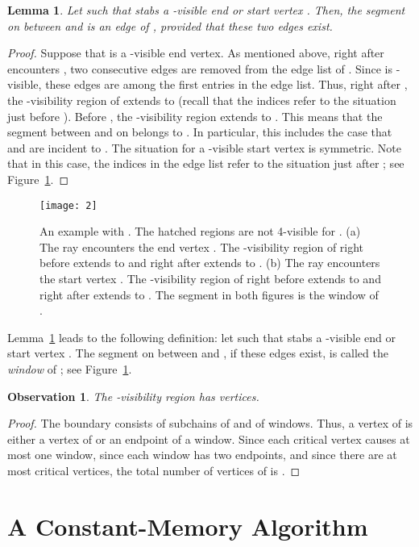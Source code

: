 \documentclass[11pt, a4paper]{article}
\newtheorem{lem}[theorem1]{Lemma}{\bfseries}{\itshape}
\newtheorem{obs}[theorem1]{Observation}{\bfseries}{\itshape}
\begin{document}
\begin{lem}\label{lem:window}
Let  such that 
 stabs a -visible end or start vertex . Then, the 
segment on  between  and 
 is an edge of ,
provided that these two edges exist.
\end{lem}
\begin{proof}
Suppose that  is a -visible end vertex. 
As mentioned above, right after  encounters
, two consecutive edges are removed from the
edge list of .
Since  is -visible, these edges are among
the first  entries in the edge list.
Thus, right after , the -visibility region of  extends
to  (recall that the indices refer to
the situation just before ). Before , the
-visibility region extends to .
This means that the segment between  and 
on  belongs to 
. In particular, this includes the case that
 and  are incident to .
The situation for a -visible start vertex  is symmetric. 
Note that in this case, the indices in the edge list refer 
to the situation just after ; see Figure~\ref{fig:fig2}.
\end{proof}

\begin{figure}
 \centering 
 \texttt{[image: 2]}
\caption{An example with . 
The hatched regions are not 4-visible for .
(a) The ray  encounters the end vertex .
The -visibility region of  right before 
extends to  and right after  extends to .
(b) The ray  encounters the start vertex .
The -visibility region of  right before 
extends to  and right after  extends to .
The segment  in both figures is the window of .}
\label{fig:fig2}
\end{figure}


Lemma~\ref{lem:window} leads to the following definition: 
let  such that
 stabs a -visible end or start
vertex . The segment on  between 
 and 
, if these edges exist, is called the \emph{window} 
of ; see Figure~\ref{fig:fig2}.

\begin{obs}\label{obs:complexity}
The -visibility region  has  vertices.
\end{obs}
\begin{proof}
The boundary  consists of subchains  
of  and of windows. Thus, a vertex of  is 
either a vertex of  or an endpoint of a window. Since each 
critical vertex causes at most one window, since each
window has two endpoints, and since there are at most  critical 
vertices, the total number of 
vertices of  is .
\end{proof}
\section{A Constant-Memory Algorithm}\label{sec:constant-memory algorithm}
\end{document}
